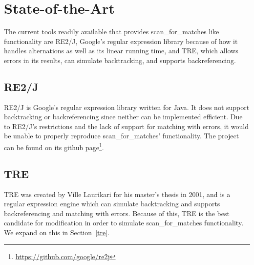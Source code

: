 \section{State-of-the-Art}
The current tools readily available that provides scan\_for\_matches like functionality are RE2/J, Google's regular 
expression library because of how it handles alternations as well as its 
linear running time, and TRE, which allows errors in its results, can 
simulate backtracking, and supports backreferencing.
 \subsection{RE2/J} %
 RE2/J is Google's regular expression library written for Java. It does not support 
 backtracking or backreferencing since neither can be implemented 
 efficient. Due to RE2/J's restrictions and the lack of support for matching with errors, it would be unable to properly reproduce 
 scan\_for\_matches' functionality. The project can be found on its github 
 page\footnote{\url{https://github.com/google/re2j}}.
 \subsection{TRE} %
 TRE was created by Ville Laurikari for his master's thesis in 2001\cite{LaurikariComplex}, and 
 is a regular expression engine which can simulate backtracking and supports 
 backreferencing and matching with errors. Because of this, TRE is the best 
 candidate for modification in order to simulate scan\_for\_matches functionality. 
 We expand on this in Section~\ref{tre}.
